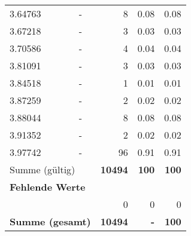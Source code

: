\begin{longtable}{lXrrr}
        3.64763 & \multicolumn{1}{X}{-} & %
          \num{8} &
          \num[round-mode=places,round-precision=2]{0.08} &
          \num[round-mode=places,round-precision=2]{0.08} \\

        3.67218 & \multicolumn{1}{X}{-} & %
          \num{3} &
          \num[round-mode=places,round-precision=2]{0.03} &
          \num[round-mode=places,round-precision=2]{0.03} \\

        3.70586 & \multicolumn{1}{X}{-} & %
          \num{4} &
          \num[round-mode=places,round-precision=2]{0.04} &
          \num[round-mode=places,round-precision=2]{0.04} \\

        3.81091 & \multicolumn{1}{X}{-} & %
          \num{3} &
          \num[round-mode=places,round-precision=2]{0.03} &
          \num[round-mode=places,round-precision=2]{0.03} \\

        3.84518 & \multicolumn{1}{X}{-} & %
          \num{1} &
          \num[round-mode=places,round-precision=2]{0.01} &
          \num[round-mode=places,round-precision=2]{0.01} \\

        3.87259 & \multicolumn{1}{X}{-} & %
          \num{2} &
          \num[round-mode=places,round-precision=2]{0.02} &
          \num[round-mode=places,round-precision=2]{0.02} \\

        3.88044 & \multicolumn{1}{X}{-} & %
          \num{8} &
          \num[round-mode=places,round-precision=2]{0.08} &
          \num[round-mode=places,round-precision=2]{0.08} \\

        3.91352 & \multicolumn{1}{X}{-} & %
          \num{2} &
          \num[round-mode=places,round-precision=2]{0.02} &
          \num[round-mode=places,round-precision=2]{0.02} \\

        3.97742 & \multicolumn{1}{X}{-} & %
          \num{96} &
          \num[round-mode=places,round-precision=2]{0.91} &
          \num[round-mode=places,round-precision=2]{0.91} \\

     \midrule
     \multicolumn{2}{l}{Summe (gültig)} &
       \textbf{\num{10494}} &
     \textbf{\num{100}} &
       \textbf{\num[round-mode=places,round-precision=2]{100}} \\
     \multicolumn{5}{l}{\textbf{Fehlende Werte}}\\
      & & 0 & 0 & 0 \\
     \midrule
     \multicolumn{2}{l}{\textbf{Summe (gesamt)}} &
          \textbf{\num{10494}} &
        \textbf{-} &
        \textbf{\num{100}} \\
     \bottomrule
     \end{longtable}
     
